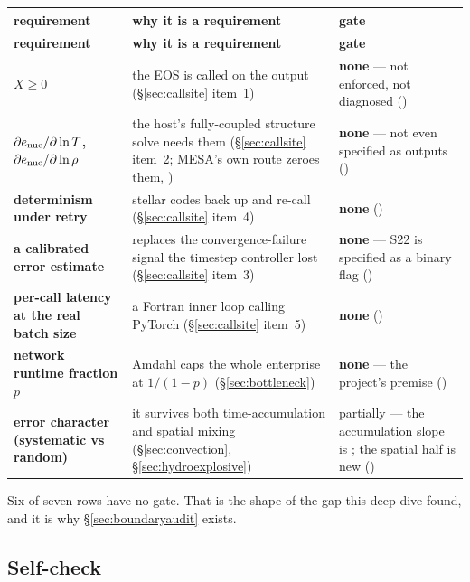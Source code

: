 \begingroup\footnotesize
\begin{longtable}{@{}L{3.4cm} L{6.6cm} L{5.0cm}@{}}
\toprule
\textbf{requirement} & \textbf{why it is a requirement} & \textbf{gate} \\
\midrule
\endfirsthead
\toprule
\textbf{requirement} & \textbf{why it is a requirement} & \textbf{gate} \\
\midrule
\endhead
\bottomrule
\endfoot

\textbf{$X \ge 0$} &
  the EOS is called on the output (\S\ref{sec:callsite} item~1) &
  \textbf{none} --- not enforced, not diagnosed () \\
\textbf{$\partial e_{\mathrm{nuc}}/\partial\ln T$, $\partial e_{\mathrm{nuc}}/\partial\ln\rho$} &
  the host's fully-coupled structure solve needs them (\S\ref{sec:callsite}
  item~2; MESA's own  route zeroes them,
  \citealt[\S 10.2]{jermyn2023}) &
  \textbf{none} --- not even specified as outputs () \\
\textbf{determinism under retry} &
  stellar codes back up and re-call (\S\ref{sec:callsite} item~4) &
  \textbf{none} () \\
\textbf{a calibrated error estimate} &
  replaces the convergence-failure signal the timestep controller lost
  (\S\ref{sec:callsite} item~3) &
  \textbf{none} --- S22 is specified as a binary flag () \\
\textbf{per-call latency at the real batch size} &
  a Fortran inner loop calling PyTorch (\S\ref{sec:callsite} item~5) &
  \textbf{none} () \\
\textbf{network runtime fraction $p$} &
  Amdahl caps the whole enterprise at $1/(1-p)$ (\S\ref{sec:bottleneck}) &
  \textbf{none} --- the project's premise () \\
\textbf{error character (systematic vs random)} &
  it survives both time-accumulation and spatial mixing
  (\S\ref{sec:convection}, \S\ref{sec:hydroexplosive}) &
  partially --- the accumulation slope is ; the spatial
  half is new () \\
\end{longtable}
\endgroup

Six of seven rows have no gate. That is the shape of the gap this deep-dive
found, and it is why \S\ref{sec:boundaryaudit} exists.

\subsection{Self-check}
\label{sec:selfcheck-host}

